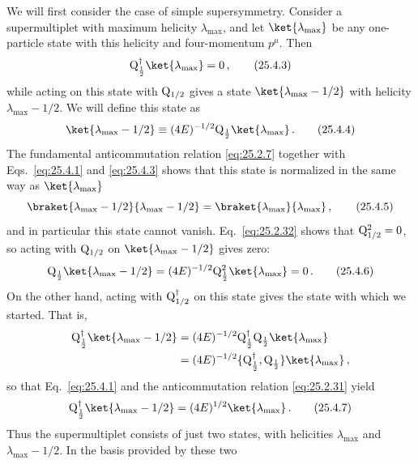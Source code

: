 We will first consider the case of simple supersymmetry. Consider a
supermultiplet with maximum helicity $\lambda_{\max}$, and let
$\ket{\lambda_{\max}}$ be any one-particle state with this helicity and
four-momentum $p^\mu$. Then
\begin{equation}
  \WeylQ^\dagger_{\frac12}\ket{\lambda_{\max}}=0\,,
  \tag{25.4.3}\label{eq:25.4.3}
\end{equation}
while acting on this state with $\mathrm{Q}_{1/2}$ gives a state
$\ket{\lambda_{\max}-1/2}$ with helicity $\lambda_{\max}-1/2$. We will
define this state as
\begin{equation}
  \ket{\lambda_{\max}-1/2}
  \equiv(4E)^{-1/2}\WeylQ_{\frac12}\ket{\lambda_{\max}}\,.
  \tag{25.4.4}\label{eq:25.4.4}
\end{equation}
The fundamental anticommutation relation \eqref{eq:25.2.7} together with
Eqs.~\eqref{eq:25.4.1} and \eqref{eq:25.4.3} shows that this state is
normalized in the same way as $\ket{\lambda_{\max}}$
\begin{equation}
  \braket{\lambda_{\max}-1/2}{\lambda_{\max}-1/2}
  =\braket{\lambda_{\max}}{\lambda_{\max}}\,,
  \tag{25.4.5}\label{eq:25.4.5}
\end{equation}
and in particular this state cannot vanish. Eq.~\eqref{eq:25.2.32} shows that
$\mathrm{Q}_{1/2}^2=0$, so acting with $\mathrm{Q}_{1/2}$ on
$\ket{\lambda_{\max}-1/2}$ gives zero:
\begin{equation}
  \WeylQ_{\frac12}\ket{\lambda_{\max}-1/2}
  =(4E)^{-1/2}\WeylQ_{\frac12}^2\ket{\lambda_{\max}}
  =0\,.
  \tag{25.4.6}\label{eq:25.4.6}
\end{equation}
On the other hand, acting with $\mathrm{Q}^\dagger_{1/2}$ on this state gives the
state with which we started. That is,
\[
  \begin{aligned}
  \WeylQ^\dagger_{\frac12}\ket{\lambda_{\max}-1/2}
  &=(4E)^{-1/2}
    \WeylQ^\dagger_{\frac12}\WeylQ_{\frac12}
    \ket{\lambda_{\max}}\\
  &=(4E)^{-1/2}
    \{\WeylQ^\dagger_{\frac12},\WeylQ_{\frac12}\}
    \ket{\lambda_{\max}}\,,
  \end{aligned}
\]
so that Eq.~\eqref{eq:25.4.1} and the anticommutation relation
\eqref{eq:25.2.31} yield
\begin{equation}
  \WeylQ^\dagger_{\frac12}\ket{\lambda_{\max}-1/2}
  =(4E)^{1/2}\ket{\lambda_{\max}}\,.
  \tag{25.4.7}\label{eq:25.4.7}
\end{equation}
Thus the supermultiplet consists of just two states, with helicities
$\lambda_{\max}$ and $\lambda_{\max}-1/2$. In the basis provided by these two
